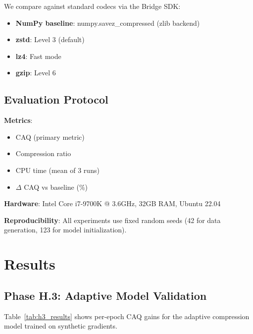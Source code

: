 \documentclass[11pt,twocolumn]{article}
\begin{document}
We compare against standard codecs via the Bridge SDK:
\begin{itemize}
    \item \textbf{NumPy baseline}: numpy.savez\_compressed (zlib backend)
    \item \textbf{zstd}: Level 3 (default)
    \item \textbf{lz4}: Fast mode
    \item \textbf{gzip}: Level 6
\end{itemize}

\subsection{Evaluation Protocol}

\textbf{Metrics}:
\begin{itemize}
    \item CAQ (primary metric)
    \item Compression ratio
    \item CPU time (mean of 3 runs)
    \item $\Delta$ CAQ vs baseline (\%)
\end{itemize}

\textbf{Hardware}: Intel Core i7-9700K @ 3.6GHz, 32GB RAM, Ubuntu 22.04

\textbf{Reproducibility}: All experiments use fixed random seeds (42 for data generation, 123 for model initialization).

\section{Results}

\subsection{Phase H.3: Adaptive Model Validation}

Table~\ref{tab:h3_results} shows per-epoch CAQ gains for the adaptive compression model trained on synthetic gradients.
\end{document}

